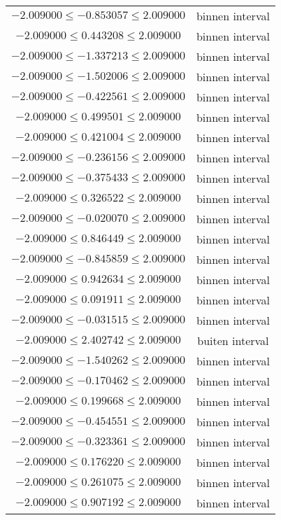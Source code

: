 \documentclass{article}
\begin{document}
\begin{longtabu}{cc}
    $-2.009000 \leq -0.853057 \leq 2.009000$ & binnen interval \\
    $-2.009000 \leq 0.443208 \leq 2.009000$ & binnen interval \\
    $-2.009000 \leq -1.337213 \leq 2.009000$ & binnen interval \\
    $-2.009000 \leq -1.502006 \leq 2.009000$ & binnen interval \\
    $-2.009000 \leq -0.422561 \leq 2.009000$ & binnen interval \\
    $-2.009000 \leq 0.499501 \leq 2.009000$ & binnen interval \\
    $-2.009000 \leq 0.421004 \leq 2.009000$ & binnen interval \\
    $-2.009000 \leq -0.236156 \leq 2.009000$ & binnen interval \\
    $-2.009000 \leq -0.375433 \leq 2.009000$ & binnen interval \\
    $-2.009000 \leq 0.326522 \leq 2.009000$ & binnen interval \\
    $-2.009000 \leq -0.020070 \leq 2.009000$ & binnen interval \\
    $-2.009000 \leq 0.846449 \leq 2.009000$ & binnen interval \\
    $-2.009000 \leq -0.845859 \leq 2.009000$ & binnen interval \\
    $-2.009000 \leq 0.942634 \leq 2.009000$ & binnen interval \\
    $-2.009000 \leq 0.091911 \leq 2.009000$ & binnen interval \\
    $-2.009000 \leq -0.031515 \leq 2.009000$ & binnen interval \\
    $-2.009000 \leq 2.402742 \leq 2.009000$ & buiten interval \\
    $-2.009000 \leq -1.540262 \leq 2.009000$ & binnen interval \\
    $-2.009000 \leq -0.170462 \leq 2.009000$ & binnen interval \\
    $-2.009000 \leq 0.199668 \leq 2.009000$ & binnen interval \\
    $-2.009000 \leq -0.454551 \leq 2.009000$ & binnen interval \\
    $-2.009000 \leq -0.323361 \leq 2.009000$ & binnen interval \\
    $-2.009000 \leq 0.176220 \leq 2.009000$ & binnen interval \\
    $-2.009000 \leq 0.261075 \leq 2.009000$ & binnen interval \\
    $-2.009000 \leq 0.907192 \leq 2.009000$ & binnen interval \\

\end{longtabu}
\end{document}
